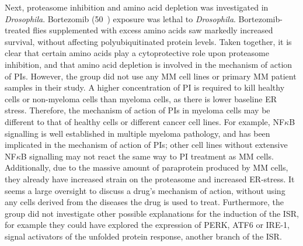 Next, proteasome inhibition and amino acid depletion was investigated in \textit{Drosophila}\cite{suraweera2012failure}.
Bortezomib (50\si{\micro\Molar}) exposure was lethal to \textit{Drosophila}.
Bortezomib-treated flies supplemented with excess amino acids saw markedly increased survival, without affecting polyubiquitinated protein levels.
Taken together, it is clear that certain amino acids play a cytoprotective role upon proteasome inhibition, and that amino acid depletion is involved in the mechanism of action of PIs.
However, the group did not use any MM cell lines or primary MM patient samples in their study.
A higher concentration of PI is required to kill healthy cells or non-myeloma cells than myeloma cells, as there is lower baseline ER stress.
Therefore, the mechanism of action of PIs in myeloma cells may be different to that of healthy cells or different cancer cell lines.
For example, NF$\kappa$B signalling is well established in multiple myeloma pathology, and has been implicated in the mechanism of action of PIs; other cell lines without extensive NF$\kappa$B signalling may not react the same way to PI treatment as MM cells.
Additionally, due to the massive amount of paraprotein produced by MM cells, they already have increased strain on the proteasome and increased ER-stress.
It seems a large oversight to discuss a drug's mechanism of action, without using any cells derived from the diseases the drug is used to treat.
Furthermore, the group did not investigate other possible explanations for the induction of the ISR, for example they could have explored the expression of PERK, ATF6 or IRE-1, signal activators of the unfolded protein response, another branch of the ISR\@.


